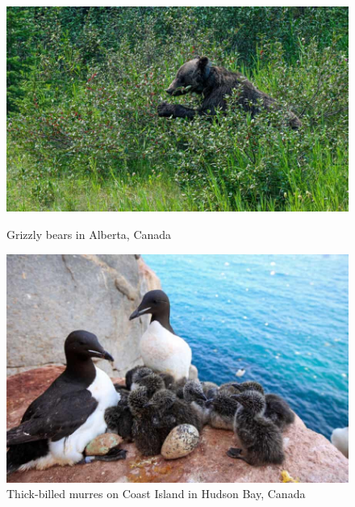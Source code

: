 \documentclass[12pt]{article}
\begin{document}
\begin{figure}[h]
\begin{minipage}{0.4\textwidth}
\centering
\includegraphics[scale=0.25]{graphic/bear.jpg}
\caption{Grizzly bears in Alberta, Canada}
\end{minipage}
\hfill
\begin{minipage}{0.45\textwidth}
\includegraphics[scale=0.25]{graphic/seabirds.jpg}
\caption{Thick-billed murres on Coast Island in Hudson Bay, Canada}
\end{minipage}
\end{figure}
\end{document}
